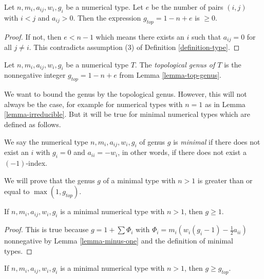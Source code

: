 \begin{lemma}
\label{lemma-top-genus}
Let $n, m_i, a_{ij}, w_i, g_i$ be a numerical type.
Let $e$ be the number of pairs $(i, j)$ with $i < j$ and $a_{ij} > 0$.
Then the expression $g_{top} = 1 - n + e$ is $\geq 0$.
\end{lemma}

\begin{proof}
If not, then $e < n - 1$ which means there exists an $i$ such that
$a_{ij} = 0$ for all $j \not = i$. This contradicts assumption
(3) of Definition \ref{definition-type}.
\end{proof}

\begin{definition}
\label{definition-top-genus}
Let $n, m_i, a_{ij}, w_i, g_i$ be a numerical type $T$. The
{\it topological genus of $T$} is the nonnegative integer
$g_{top} = 1 - n + e$ from Lemma \ref{lemma-top-genus}.
\end{definition}

\noindent
We want to bound the genus by the topological genus. However, this
will not always be the case, for example for numerical types
with $n = 1$ as in Lemma \ref{lemma-irreducible}. But it will
be true for minimal numerical types which are defined as follows.

\begin{definition}
\label{definition-type-minimal}
We say the numerical type $n, m_i, a_{ij}, w_i, g_i$ of genus $g$
is {\it minimal} if there does not exist an $i$
with $g_i = 0$ and $a_{ii} = -w_i$, in other words, if there
does not exist a $(-1)$-index.
\end{definition}

\noindent
We will prove that the genus $g$ of a minimal type with $n > 1$
is greater than or equal to $\max(1, g_{top})$.

\begin{lemma}
\label{lemma-non-irreducible-minimal-type-genus-at-least-one}
If $n, m_i, a_{ij}, w_i, g_i$ is a minimal numerical type
with $n > 1$, then $g \geq 1$.
\end{lemma}

\begin{proof}
This is true because $g = 1 + \sum \Phi_i$ with
$\Phi_i = m_i(w_i(g_i - 1) - \frac{1}{2} a_{ii})$ nonnegative
by Lemma \ref{lemma-minus-one} and the definition of minimal types.
\end{proof}

\begin{lemma}
\label{lemma-genus-nonnegative}
If $n, m_i, a_{ij}, w_i, g_i$ is a minimal numerical type
with $n > 1$, then $g \geq g_{top}$.
\end{lemma}

